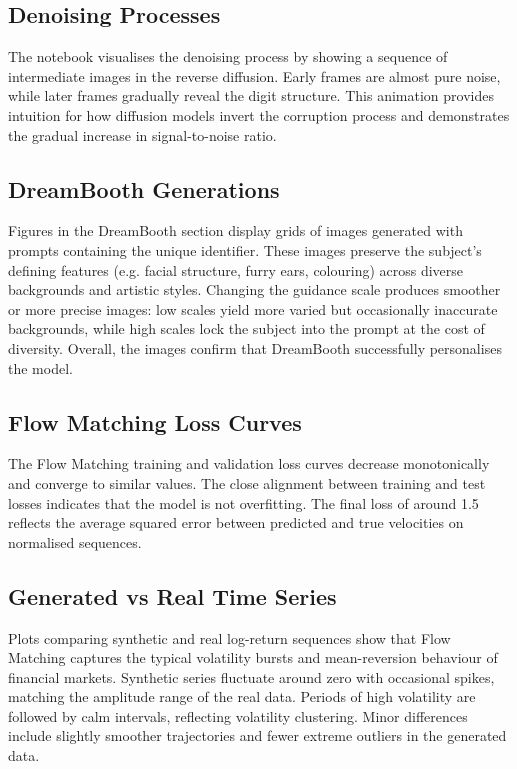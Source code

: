 \subsection{Denoising Processes}

The notebook visualises the denoising process by showing a sequence
of intermediate images in the reverse diffusion.  Early frames are
almost pure noise, while later frames gradually reveal the digit
structure.  This animation provides intuition for how diffusion
models invert the corruption process and demonstrates the gradual
increase in signal-to-noise ratio.

\subsection{DreamBooth Generations}

Figures in the DreamBooth section display grids of images generated
with prompts containing the unique identifier.  These images
preserve the subject’s defining features (e.g. facial structure,
furry ears, colouring) across diverse backgrounds and artistic
styles.  Changing the guidance scale produces smoother or more
precise images: low scales yield more varied but occasionally
inaccurate backgrounds, while high scales lock the subject into the
prompt at the cost of diversity.  Overall, the images confirm that
DreamBooth successfully personalises the model.

\subsection{Flow Matching Loss Curves}

The Flow Matching training and validation loss curves decrease
monotonically and converge to similar values.  The close alignment
between training and test losses indicates that the model is not
overfitting.  The final loss of around 1.5 reflects the average
squared error between predicted and true velocities on normalised
sequences.

\subsection{Generated vs Real Time Series}

Plots comparing synthetic and real log-return sequences show that
Flow Matching captures the typical volatility bursts and mean-reversion
behaviour of financial markets.  Synthetic series fluctuate around
zero with occasional spikes, matching the amplitude range of the
real data.  Periods of high volatility are followed by calm
intervals, reflecting volatility clustering.  Minor differences
include slightly smoother trajectories and fewer extreme outliers in
the generated data.


